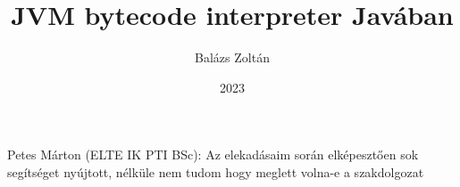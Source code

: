 \documentclass[
]{elteikthesis}[2022/04/30]
\title{JVM bytecode interpreter Javában} %
\date{2023} %
\author{Balázs Zoltán}
\affiliation{egyetemi docens} %
\begin{document}


\newcommand{\stagemagic}[1]{\textcolor{brown}{#1}}
\newcommand{\stageminor}[1]{\textcolor{orange}{#1}}
\newcommand{\stagemajor}[1]{\textcolor{red}{#1}}
\newcommand{\stageconstantsize}[1]{\textcolor{green}{#1}}
\newcommand{\stageconstantpool}[1]{\textcolor{teal}{#1}}
\newcommand{\stageaccessflags}[1]{\textcolor{blue}{#1}}
\newcommand{\stagethisclass}[1]{\textcolor{magenta}{#1}}
\newcommand{\stagesuperclass}[1]{\textcolor{violet}{#1}}
\newcommand{\stageinterfacesize}[1]{\textcolor{cyan}{#1}}
\newcommand{\stagefieldsize}[1]{\textcolor{orange}{#1}}
\newcommand{\stagemethodsize}[1]{\textcolor{red}{#1}}
\newcommand{\stagemethods}[1]{\textcolor{purple}{#1}}
\newcommand{\stageattributes}[1]{\textcolor{lime}{#1}}

\maketitle


\tableofcontents
\cleardoublepage{}


\cleardoublepage{}


\cleardoublepage{}


\cleardoublepage{}


\cleardoublepage{}

\chapter*{\acklabel}
Petes Márton (ELTE IK PTI BSc): Az elekadásaim során elképesztően sok segítséget nyújtott, nélküle nem tudom hogy meglett volna-e a szakdolgozat

\printbibliography[title=\biblabel]
\cleardoublepage{}

\listoffigures
\cleardoublepage{}

\listoftables
\cleardoublepage{}

\listofalgorithms{}
\cleardoublepage{}

\lstlistoflistings{}
\cleardoublepage{}

\end{document}
